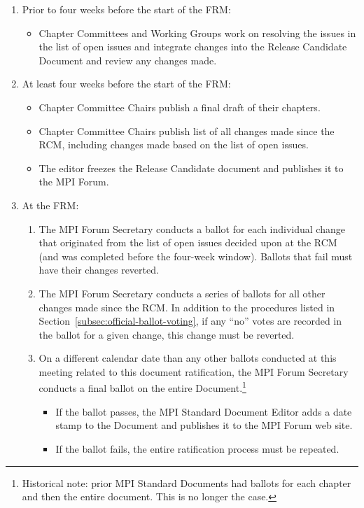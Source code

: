 {{\begin{enumerate}
\item Prior to four weeks before the start of the FRM:
  \begin{itemize}
  \item Chapter Committees and Working Groups work on resolving the
    issues in the list of open issues and integrate changes into the
    Release Candidate Document and review any changes made.
  \end{itemize}

\item At least four weeks before the start of the FRM:
  \begin{itemize}
  \item Chapter Committee Chairs publish a final draft of their
    chapters.
  \item Chapter Committee Chairs publish list of all changes made
    since the RCM, including changes made based on the list of open
    issues.
  \item The editor freezes the Release Candidate document and
    publishes it to the MPI Forum.
  \end{itemize}

\item At the FRM:
  \begin{enumerate}
  \item The MPI Forum Secretary conducts a ballot for each individual
    change that originated from the list of open issues decided upon
    at the RCM (and was completed before the four-week window).
    Ballots that fail must have their changes reverted.
  \item The MPI Forum Secretary conducts a series of ballots for all
    other changes made since the RCM.  In addition to the procedures
    listed in Section~\ref{subsec:official-ballot-voting}, if any
    ``no'' votes are recorded in the ballot for a given change, this
    change must be reverted.
  \item On a different calendar date than any other ballots conducted
    at this meeting related to this document ratification, the MPI
    Forum Secretary conducts a final ballot on the entire
    Document.\footnote{Historical note: prior MPI Standard Documents
      had ballots for each chapter and then the entire document.  This
      is no longer the case.}
    \begin{itemize}
    \item If the ballot passes, the MPI Standard Document Editor adds
      a date stamp to the Document and publishes it to the MPI Forum
      web site.
    \item If the ballot fails, the entire ratification process must be
      repeated.
    \end{itemize}
   \end{enumerate}
\end{enumerate}

}} %

